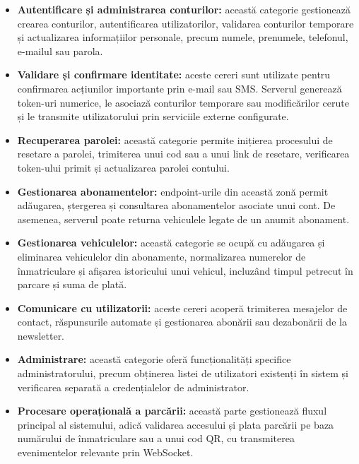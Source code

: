 \begin{itemize}
    \item \textbf{Autentificare și administrarea conturilor:} această categorie gestionează crearea conturilor, autentificarea utilizatorilor, validarea conturilor temporare și actualizarea informațiilor personale, precum numele, prenumele, telefonul, e-mailul sau parola.

    \item \textbf{Validare și confirmare identitate:} aceste cereri sunt utilizate pentru confirmarea acțiunilor importante prin e-mail sau SMS. Serverul generează token-uri numerice, le asociază conturilor temporare sau modificărilor cerute și le transmite utilizatorului prin serviciile externe configurate.

    \item \textbf{Recuperarea parolei:} această categorie permite inițierea procesului de resetare a parolei, trimiterea unui cod sau a unui link de resetare, verificarea token-ului primit și actualizarea parolei contului.

    \item \textbf{Gestionarea abonamentelor:} endpoint-urile din această zonă permit adăugarea, ștergerea și consultarea abonamentelor asociate unui cont. De asemenea, serverul poate returna vehiculele legate de un anumit abonament.

    \item \textbf{Gestionarea vehiculelor:} această categorie se ocupă cu adăugarea și eliminarea vehiculelor din abonamente, normalizarea numerelor de înmatriculare și afișarea istoricului unui vehicul, incluzând timpul petrecut în parcare și suma de plată.

    \item \textbf{Comunicare cu utilizatorii:} aceste cereri acoperă trimiterea mesajelor de contact, răspunsurile automate și gestionarea abonării sau dezabonării de la newsletter.

    \item \textbf{Administrare:} această categorie oferă funcționalități specifice administratorului, precum obținerea listei de utilizatori existenți în sistem și verificarea separată a credențialelor de administrator.

    \item \textbf{Procesare operațională a parcării:} această parte gestionează fluxul principal al sistemului, adică validarea accesului și plata parcării pe baza numărului de înmatriculare sau a unui cod QR, cu transmiterea evenimentelor relevante prin WebSocket.
\end{itemize}

